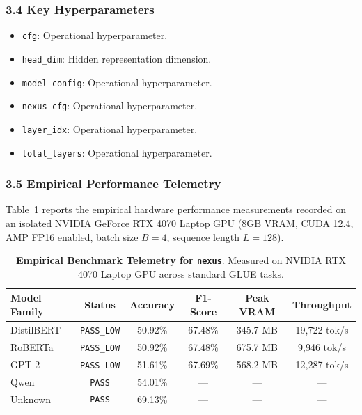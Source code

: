 \subsubsection*{3.4 Key Hyperparameters}
\begin{itemize}
    \item \texttt{cfg}: Operational hyperparameter.
    \item \texttt{head\_dim}: Hidden representation dimension.
    \item \texttt{model\_config}: Operational hyperparameter.
    \item \texttt{nexus\_cfg}: Operational hyperparameter.
    \item \texttt{layer\_idx}: Operational hyperparameter.
    \item \texttt{total\_layers}: Operational hyperparameter.
\end{itemize}

\subsubsection*{3.5 Empirical Performance Telemetry}
Table~\ref{tab:telemetry_nexus} reports the empirical hardware performance measurements recorded on an isolated NVIDIA GeForce RTX 4070 Laptop GPU (8GB VRAM, CUDA 12.4, AMP FP16 enabled, batch size $B=4$, sequence length $L=128$).

\begin{table}[h]
\centering
\small
\caption{\textbf{Empirical Benchmark Telemetry for \texttt{nexus}}. Measured on NVIDIA RTX 4070 Laptop GPU across standard GLUE tasks.}
\label{tab:telemetry_nexus}
\begin{tabular*}{\columnwidth}{@{\extracolsep{\fill}}lccccc}
\toprule
\textbf{Model Family} & \textbf{Status} & \textbf{Accuracy} & \textbf{F1-Score} & \textbf{Peak VRAM} & \textbf{Throughput} \\
\midrule
DistilBERT & \texttt{PASS\_LOW} & 50.92\% & 67.48\% & 345.7 MB & 19,722 tok/s \\
RoBERTa & \texttt{PASS\_LOW} & 50.92\% & 67.48\% & 675.7 MB & 9,946 tok/s \\
GPT-2 & \texttt{PASS\_LOW} & 51.61\% & 67.69\% & 568.2 MB & 12,287 tok/s \\
Qwen & \texttt{PASS} & 54.01\% & --- & --- & --- \\
Unknown & \texttt{PASS} & 69.13\% & --- & --- & --- \\
\bottomrule
\end{tabular*}
\end{table}

